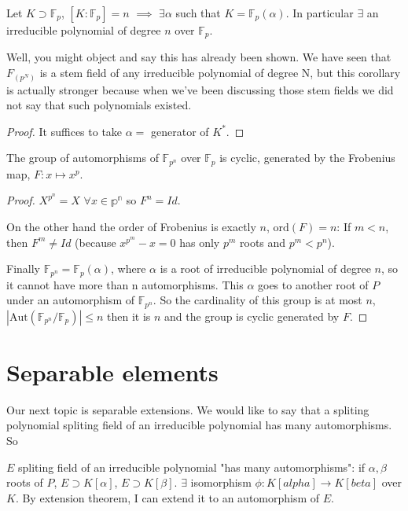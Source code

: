 \begin{corollary}
Let $K\supset \mathbb{F}_p$, $[K:\mathbb{F}_p]=n$ $\implies$ $\exists\alpha$ such that $K=\mathbb{F}_p(\alpha)$. In particular $\exists$ an irreducible polynomial of degree $n$ over $\mathbb{F}_p$.  
\end{corollary}

Well, you might object and say this has already been shown. We have seen that $F_(p^N)$ is a stem field of any irreducible polynomial of degree N, but this corollary is actually stronger because when we've been discussing those stem fields we did not say that such polynomials existed. 

\begin{proof}
It suffices to take $\alpha=$ generator of $K^*$.
\end{proof}

\begin{corollary}
The group of automorphisms of $\mathbb{F}_{p^n}$ over $\mathbb{F}_p$ is cyclic, generated by the Frobenius map, $F:x\mapsto x^p$.
\end{corollary}

\begin{proof}
$X^{p^n}=X$ $\forall x\in \mathbb{p^n}$ so $F^n=Id$. 

On the other hand the order of Frobenius is exactly $n$, $\text{ord}(F)=n$: If $m<n$, then $F^m\neq Id$ (because $x^{p^m} - x = 0$ has only $p^m$ roots and $p^m<p^n$). 

Finally $\mathbb{F}_{p^n}=\mathbb{F}_p(\alpha)$, where $\alpha$ is a root of irreducible polynomial of degree $n$, so it cannot have more than n automorphisms. This $\alpha$ goes to another root of $P$ under an automorphism of $\mathbb{F}_{p^n}$. So the cardinality of this group is at most $n$, $|\text{Aut}(\mathbb{F}_{p^n}/\mathbb{F}_p)|\leq n$ then it is $n$ and the group is cyclic generated by $F$.
\end{proof}

\section{Separable elements}

Our next topic is separable extensions. We would like to say that
a spliting polynomial spliting field of an irreducible
polynomial has many automorphisms. So 

$E$ spliting field of an irreducible polynomial "has many automorphisms":  if $\alpha,\beta$ roots of $P$, $E \supset K[\alpha]$, $E\supset K[\beta]$. $\exists$ isomorphism $\phi: K[alpha]\to K[beta]$ over $K$.  By extension theorem, I can extend it to an automorphism of $E$. 

